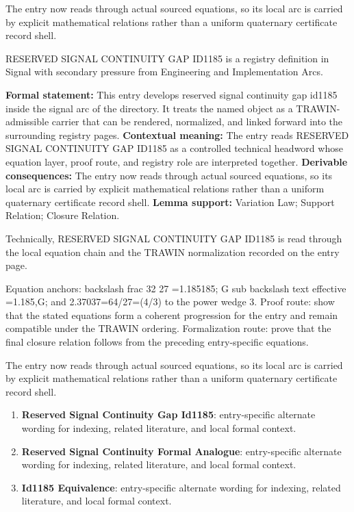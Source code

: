 The entry now reads through actual sourced equations, so its local arc is carried by explicit mathematical relations rather than a uniform quaternary certificate record shell.
\clearpage


\begingroup\small
{}
RESERVED SIGNAL CONTINUITY GAP ID1185 is a registry definition in Signal with secondary pressure from Engineering and Implementation Arcs.

\begingroup\footnotesize\setlength{\emergencystretch}{3em}\sloppy
\textbf{Formal statement:} This entry develops reserved signal continuity gap id1185 inside the signal arc of the directory. It treats the named object as a TRAWIN-admissible carrier that can be rendered, normalized, and linked forward into the surrounding registry pages. \textbf{Contextual meaning:} The entry reads RESERVED SIGNAL CONTINUITY GAP ID1185 as a controlled technical headword whose equation layer, proof route, and registry role are interpreted together. \textbf{Derivable consequences:} The entry now reads through actual sourced equations, so its local arc is carried by explicit mathematical relations rather than a uniform quaternary certificate record shell. \textbf{Lemma support:} Variation Law; Support Relation; Closure Relation.\par
\endgroup

Technically, RESERVED SIGNAL CONTINUITY GAP ID1185 is read through the local equation chain and the TRAWIN normalization recorded on the entry page.

Equation anchors: backslash frac 32 27 =1.185185; G sub backslash text effective =1.185,G; and 2.37037=64/27=(4/3) to the power wedge 3. Proof route: show that the stated equations form a coherent progression for the entry and remain compatible under the TRAWIN ordering. Formalization route: prove that the final closure relation follows from the preceding entry-specific equations.

The entry now reads through actual sourced equations, so its local arc is carried by explicit mathematical relations rather than a uniform quaternary certificate record shell.
\endgroup

\begin{enumerate}[leftmargin=1.6em,itemsep=6pt,topsep=4pt]
\item \textbf{Reserved Signal Continuity Gap Id1185}: entry-specific alternate wording for indexing, related literature, and local formal context.
\item \textbf{Reserved Signal Continuity Formal Analogue}: entry-specific alternate wording for indexing, related literature, and local formal context.
\item \textbf{Id1185 Equivalence}: entry-specific alternate wording for indexing, related literature, and local formal context.
\end{enumerate}

